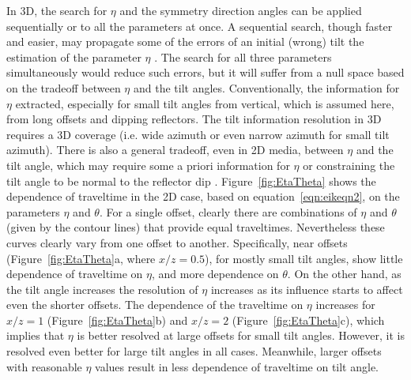 In 3D, the search for $\eta$ and the symmetry direction angles can be applied  
sequentially or  to all the parameters at once. A sequential search, though
faster and easier, may propagate some of the errors of an initial
(wrong) tilt  the estimation of the parameter $\eta$ \cite[]{ttt}. The
search for all three parameters simultaneously would reduce such errors, but it will suffer from a null space based on the tradeoff between
$\eta$ and the tilt angles. Conventionally, the information for $\eta$   extracted, especially for small tilt angles from vertical,
which is assumed here, from long offsets and dipping reflectors. The tilt information resolution in 3D requires a 3D coverage
(i.e. wide azimuth or even narrow azimuth for small tilt azimuth). There is also a general tradeoff, even in 2D media, between $\eta$ and the
tilt angle, which may require some a priori information for $\eta$ or constraining the tilt angle to be normal to the reflector dip \cite[]{SEG-2000-09650968}.
Figure~\ref{fig:EtaTheta} shows the dependence of traveltime in the 2D case, based on equation~\ref{eqn:eikeqn2}, on the 
parameters $\eta$ and $\theta$. For a single offset, clearly there are combinations of $\eta$ and $\theta$ (given by the contour lines) that provide
equal traveltimes. Nevertheless these curves clearly vary from one offset to another. Specifically, near offsets (Figure~\ref{fig:EtaTheta}a,
where $x/z=0.5$), for mostly small tilt angles, show little
dependence of traveltime on $\eta$, and more dependence on $\theta$. 
On the other hand, as the tilt angle increases the resolution of $\eta$ increases as
its influence starts to affect even the shorter offsets. The dependence of the traveltime
on $\eta$ increases for $x/z=1$ (Figure~\ref{fig:EtaTheta}b) and $x/z=2$ 
(Figure~\ref{fig:EtaTheta}c), which implies that $\eta$ is better resolved at large offsets for small tilt angles. However, it is resolved even better for
large tilt angles in all cases. Meanwhile, larger offsets with reasonable $\eta$ values result in less dependence of  traveltime on tilt angle.

